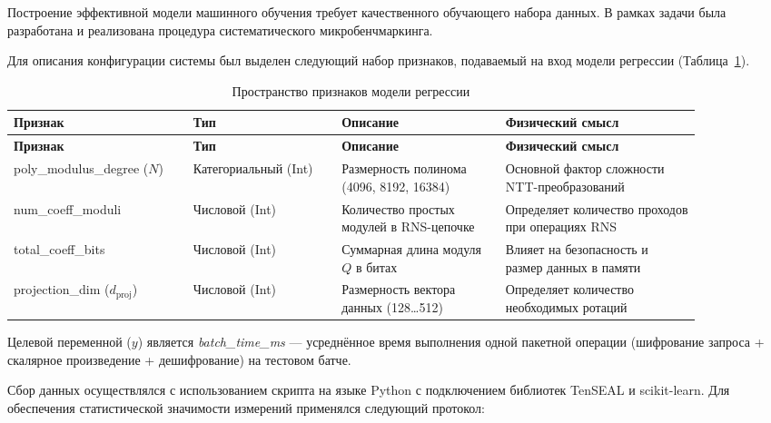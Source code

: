 \documentclass[a4paper, 12pt, oneside, openany]{article}
\begin{document}
Построение эффективной модели машинного обучения требует качественного обучающего набора данных. В рамках задачи была разработана и реализована процедура систематического микробенчмаркинга.

Для описания конфигурации системы был выделен следующий набор признаков, подаваемый на вход модели регрессии (Таблица~\ref{tab:3-1}).

\begingroup\small\setlength{\tabcolsep}{3pt}
\begin{longtable}{@{}
		>{\raggedright\arraybackslash}p{0.23\linewidth}
		>{\raggedright\arraybackslash}p{0.19\linewidth}
		>{\raggedright\arraybackslash}p{0.21\linewidth}
		>{\raggedright\arraybackslash}p{0.25\linewidth}
		@{}}
	\caption{Пространство признаков модели регрессии}\label{tab:3-1}\\*
	\toprule
	\textbf{Признак} & \textbf{Тип} & \textbf{Описание} & \textbf{Физический смысл} \\
	\midrule
	\endfirsthead
	
	\toprule
	\textbf{Признак} & \textbf{Тип} & \textbf{Описание} & \textbf{Физический смысл} \\
	\midrule
	\endhead
	
	\bottomrule
	\endfoot
	
	\bottomrule
	\endlastfoot
	
	poly\_modulus\_degree ($N$) &
	Категориальный (Int) &
	Размерность полинома (4096, 8192, 16384) &
	Основной фактор сложности NTT-преобразований \\
	
	num\_coeff\_moduli &
	Числовой (Int) &
	Количество простых модулей в RNS-цепочке &
	Определяет количество проходов при операциях RNS \\
	
	total\_coeff\_bits &
	Числовой (Int) &
	Суммарная длина модуля $Q$ в битах &
	Влияет на безопасность и размер данных в памяти \\
	
	projection\_dim ($d_{\mathrm{proj}}$) &
	Числовой (Int) &
	Размерность вектора данных (128\ldots512) &
	Определяет количество необходимых ротаций \\
	
\end{longtable}
\endgroup

Целевой переменной (\(y\)) является \emph{batch\_time\_ms} --- усреднённое время выполнения одной пакетной операции (шифрование запроса + скалярное произведение + дешифрование) на тестовом батче.

Сбор данных осуществлялся с использованием скрипта на языке Python с подключением библиотек TenSEAL и scikit-learn. Для обеспечения статистической значимости измерений применялся следующий протокол:
\end{document}
